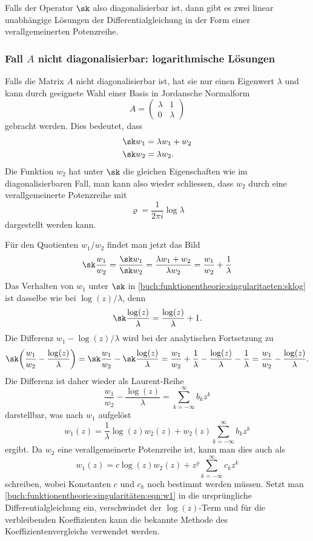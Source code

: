 Falls der Operator $\sk$ also diagonalisierbar ist, dann gibt es
zwei linear unabhängige Lösungen der Differentialgleichung in der
Form einer verallgemeinerten Potenzreihe.

%
%
\subsubsection{Fall $A$ nicht diagonalisierbar: logarithmische Lösungen}
Falls die Matrix $A$ nicht diagonalisierbar ist, hat sie nur einen
Eigenwert $\lambda$ und kann durch geeignete Wahl einer Basis in
Jordansche Normalform
\[
A
=
\begin{pmatrix}
\lambda &    1    \\
   0    & \lambda
\end{pmatrix}
\]
gebracht werden.
Dies bedeutet, dass
\begin{align*}
\sk w_1 &= \lambda w_1 + w_2
\\
\sk w_2 &= \lambda w_2.
\end{align*}
Die Funktion $w_2$ hat unter $\sk$ die gleichen Eigenschaften
wie im diagonalisierbaren Fall, man kann also wieder schliessen,
dass $w_2$ durch eine verallgemeinerte Potenzreihe mit
\[
\varrho=\frac{1}{2\pi i} \log \lambda
\]
dargestellt werden kann.

Für den Quotienten $w_1/w_2$ findet man jetzt das Bild
\begin{equation}
\sk \frac{w_1}{w_2}
=
\frac{\sk w_1}{\sk w_2}
=
\frac{\lambda w_1+w_2}{\lambda w_2}
=
\frac{w_1}{w_2} + \frac{1}{\lambda}
\label{buch:funktionentheorie:singularitaeten:sklog}
\end{equation}
Das Verhalten von $w_1$ unter $\sk$ in
\eqref{buch:funktionentheorie:singularitaeten:sklog}
ist dasselbe wie bei $\log(z)/\lambda$, denn
\[
\sk \frac{\log(z)}{\lambda}
=
\frac{\log(z)}{\lambda} + 1.
\]
Die Differenz $w_1-\log(z)/\lambda$ wird bei der analytischen
Fortsetzung zu
\[
\sk\biggl(
\frac{w_1}{w_2}-\frac{\log(z)}{\lambda}
\biggr)
=
\sk \frac{w_1}{w_2} - \sk\frac{\log(z)}{\lambda}
=
\frac{w_1}{w_2} + \frac{1}{\lambda}
-
\frac{\log(z)}{\lambda}
-\frac{1}{\lambda}
=
\frac{w_1}{w_2}-\frac{\log(z)}{\lambda}.
\]
Die Differenz ist daher wieder als Laurent-Reihe
\[
\frac{w_1}{w_2}-\frac{\log(z)}{\lambda}
=
\sum_{k=-\infty}^\infty b_kz^k
\]
darstellbar, was nach $w_1$ aufgelöst 
\[
w_1(z)
=
\frac{1}{\lambda} \log(z) w_2(z)
+
w_2(z) \sum_{k=-\infty}^\infty b_kz^k
\]
ergibt.
Da $w_2$ eine verallgemeinerte Potenzreihe ist, kann man dies auch
als
\begin{equation}
w_1(z)
=
c \log(z) w_2(z)
+
z^{\varrho}
\sum_{k=-\infty}^{\infty} c_kz^k
\label{buch:funktionentheorie:singularitäten:eqn:w1}
\end{equation}
schreiben, wobei Konstanten $c$ und $c_k$ noch bestimmt werden müssen.
Setzt man
\eqref{buch:funktionentheorie:singularitäten:eqn:w1}
in die ursprüngliche Differentialgleichung ein, verschwindet der
$\log(z)$-Term und für die verbleibenden Koeffizienten kann die
bekannte Methode des Koeffizientenvergleichs verwendet werden.

